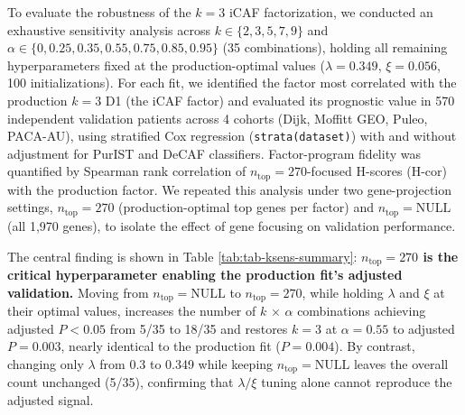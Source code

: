 \documentclass[
]{article}
\begin{document}
To evaluate the robustness of the \(k = 3\) iCAF factorization, we
conducted an exhaustive sensitivity analysis across
\(k \in \{2, 3, 5, 7, 9\}\) and
\(\alpha \in \{0, 0.25, 0.35, 0.55, 0.75, 0.85, 0.95\}\) (35
combinations), holding all remaining hyperparameters fixed at the
production-optimal values (\(\lambda = 0.349\), \(\xi = 0.056\), 100
initializations). For each fit, we identified the factor most correlated
with the production \(k = 3\) D1 (the iCAF factor) and evaluated its
prognostic value in 570 independent validation patients across 4 cohorts
(Dijk, Moffitt GEO, Puleo, PACA-AU), using stratified Cox regression
(\texttt{strata(dataset)}) with and without adjustment for PurIST and
DeCAF classifiers. Factor-program fidelity was quantified by Spearman
rank correlation of \(n_{\text{top}} = 270\)-focused H-scores (H-cor)
with the production factor. We repeated this analysis under two
gene-projection settings, \(n_{\text{top}} = 270\) (production-optimal
top genes per factor) and \(n_{\text{top}} = \text{NULL}\) (all 1,970
genes), to isolate the effect of gene focusing on validation
performance.

The central finding is shown in Table \ref{tab:tab-ksens-summary}:
\textbf{\(n_{\text{top}} = 270\) is the critical hyperparameter enabling
the production fit's adjusted validation.} Moving from
\(n_{\text{top}} = \text{NULL}\) to \(n_{\text{top}} = 270\), while
holding \(\lambda\) and \(\xi\) at their optimal values, increases the
number of \(k\) \(\times\) \(\alpha\) combinations achieving adjusted
\(P < 0.05\) from 5/35 to 18/35 and restores \(k = 3\) at
\(\alpha=0.55\) to adjusted \(P = 0.003\), nearly identical to the
production fit (\(P = 0.004\)). By contrast, changing only \(\lambda\)
from 0.3 to 0.349 while keeping \(n_{\text{top}} = \text{NULL}\) leaves
the overall count unchanged (5/35), confirming that \(\lambda/\xi\)
tuning alone cannot reproduce the adjusted signal.
\end{document}
